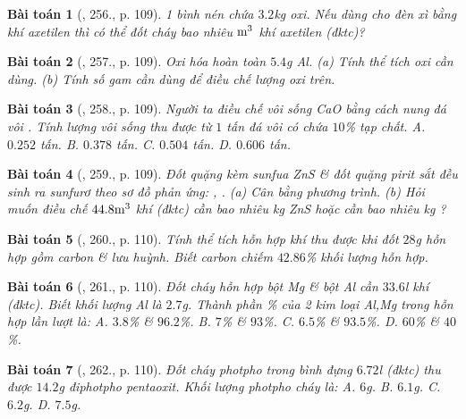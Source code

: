 \documentclass{article}
\newtheorem{baitoan}{Bài toán}
\begin{document}
\begin{baitoan}[\cite{An_400_BT_Hoa_Hoc_8_2020}, 256., p. 109]
	1 bình nén chứa $3.2$\emph{kg} oxi. Nếu dùng cho đèn xì bằng khí axetilen thì có thể đốt cháy bao nhiêu $\rm m^3$ khí axetilen (đktc)?
\end{baitoan}

\begin{baitoan}[\cite{An_400_BT_Hoa_Hoc_8_2020}, 257., p. 109]
	Oxi hóa hoàn toàn $5.4$\emph{g Al}. (a) Tính thể tích oxi cần dùng. (b) Tính số gam \emph{} cần dùng để điều chế lượng oxi trên.
\end{baitoan}

\begin{baitoan}[\cite{An_400_BT_Hoa_Hoc_8_2020}, 258., p. 109]
	Người ta điều chế vôi sống \emph{CaO} bằng cách nung đá vôi \emph{}. Tính lượng vôi sống thu được từ $1$ tấn đá vôi có chứa $10$\% tạp chất. {\sf A.} $0.252$ tấn. {\sf B.} $0.378$ tấn. {\sf C.} $0.504$ tấn. {\sf D.} $0.606$ tấn.
\end{baitoan}

\begin{baitoan}[\cite{An_400_BT_Hoa_Hoc_8_2020}, 259., p. 109]
	Đốt quặng kèm sunfua \emph{ZnS} \& đốt quặng pirit sắt \emph{} đều sinh ra sunfurơ \emph{} theo sơ đồ phản ứng: \emph{}, \emph{}. (a) Cân bằng phương trình. (b) Hỏi muốn điều chế $44.8\rm m^3$ khí \emph{} (đktc) cần bao nhiêu \emph{kg ZnS} hoặc cần bao nhiêu \emph{kg }?
\end{baitoan}

\begin{baitoan}[\cite{An_400_BT_Hoa_Hoc_8_2020}, 260., p. 110]
	Tính thể tích hỗn hợp khí thu được khi đốt $28$\emph{g} hỗn hợp gồm carbon \& lưu huỳnh. Biết carbon chiếm $42.86$\% khối lượng hỗn hợp.
\end{baitoan}

\begin{baitoan}[\cite{An_400_BT_Hoa_Hoc_8_2020}, 261., p. 110]
	Đốt cháy hỗn hợp bột \emph{Mg} \& bột \emph{Al} cần $33.6$\emph{l} khí \emph{} (đktc). Biết khối lượng \emph{Al} là $2.7$\emph{g}. Thành phần \% của 2 kim loại \emph{Al,Mg} trong hỗn hợp lần lượt là: {\sf A.} $3.8$\% \& $96.2$\%. {\sf B.} $7$\% \& $93$\%. {\sf C.} $6.5$\% \& $93.5$\%. {\sf D.} $60$\% \& $40$\%.
\end{baitoan}

\begin{baitoan}[\cite{An_400_BT_Hoa_Hoc_8_2020}, 262., p. 110]
	Đốt cháy photpho trong bình đựng $6.72$\emph{l } (đktc) thu được $14.2$\emph{g} điphotpho pentaoxit. Khối lượng photpho cháy là: {\sf A.} $6$\emph{g}. {\sf B.} $6.1$\emph{g}. {\sf C.} $6.2$\emph{g}. {\sf D.} $7.5$\emph{g}.
\end{baitoan}
\end{document}
